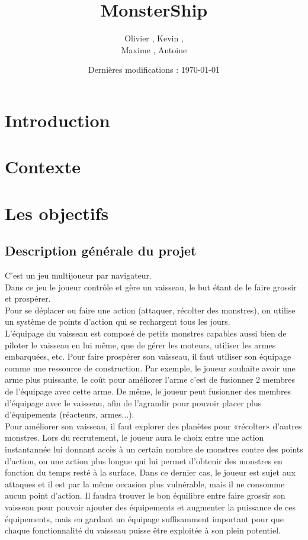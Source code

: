 \documentclass[a4paper,11pt]{report}
\title{MonsterShip\texttrademark }
\author{Olivier \bsc{Boissard}, Kevin \bsc{Boulala},\\
Maxime \bsc{Dubois}, Antoine \bsc{Lavier}}
\date{Dernières modifications : \today}
\begin{document}
\maketitle
\setcounter{tocdepth}{1}
\tableofcontents

\chapter{Introduction}


\chapter{Contexte}


\chapter{Les objectifs}
    \section{Description générale du projet}
    C'est un jeu multijoueur par navigateur.\\

    Dans ce jeu le joueur contrôle et gère un vaisseau, le but étant de le faire grossir et prospérer.\\

    Pour se déplacer ou faire une action (attaquer, récolter des monstres), on utilise un système de points d'action qui se rechargent tous les jours.\\

    L’équipage du vaisseau est composé de petits monstres capables aussi bien de piloter le vaisseau en lui même, que de gérer les moteurs, utiliser les armes embarquées, etc. Pour faire prospérer son vaisseau, il faut utiliser son équipage comme une ressource de construction. Par exemple, le joueur souhaite avoir une arme plus puissante, le coût pour améliorer l’arme c’est de fusionner 2 membres de l’équipage avec cette arme. De même, le joueur peut fusionner des membres d'équipage avec le vaisseau, afin de l'agrandir pour pouvoir placer plus d'équipements (réacteurs, armes...).\\

    Pour améliorer son vaisseau, il faut explorer des planètes pour «récolter» d’autres monstres. Lors du recrutement, le joueur aura le choix entre une action instantannée lui donnant accès à un certain nombre de monstres contre des points d'action, ou une action plus longue qui lui permet d'obtenir des monstres en fonction du temps resté à la surface. Dans ce dernier cas, le joueur est sujet aux attaques et il est par la même occasion plus vulnérable, mais il ne consomme aucun point d'action. Il faudra trouver le bon équilibre entre faire grossir son vaisseau pour pouvoir ajouter des équipements et augmenter la puissance de ces équipements, mais en gardant un équipage suffisamment important pour que chaque fonctionnalité du vaisseau puisse être exploitée à son plein potentiel.\\
\end{document}
